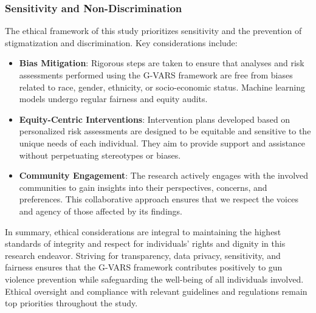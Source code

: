 \documentclass[11pt]{article}
\begin{document}
\subsubsection{Sensitivity and Non-Discrimination}

The ethical framework of this study prioritizes sensitivity and the prevention of stigmatization and discrimination. Key considerations include:

\begin{itemize}
    \item \textbf{Bias Mitigation}: Rigorous steps are taken to ensure that analyses and risk assessments performed using the \textsf{G-VARS} framework are free from biases related to race, gender, ethnicity, or socio-economic status. Machine learning models undergo regular fairness and equity audits.
    
    \item \textbf{Equity-Centric Interventions}: Intervention plans developed based on personalized risk assessments are designed to be equitable and sensitive to the unique needs of each individual. They aim to provide support and assistance without perpetuating stereotypes or biases.
    
    \item \textbf{Community Engagement}: The research actively engages with the involved communities to gain insights into their perspectives, concerns, and preferences. This collaborative approach ensures that we respect the voices and agency of those affected by its findings.
\end{itemize}

In summary, ethical considerations are integral to maintaining the highest standards of integrity and respect for individuals' rights and dignity in this research endeavor. Striving for transparency, data privacy, sensitivity, and fairness ensures that the \textsf{G-VARS} framework contributes positively to gun violence prevention while safeguarding the well-being of all individuals involved. Ethical oversight and compliance with relevant guidelines and regulations remain top priorities throughout the study.
\end{document}
